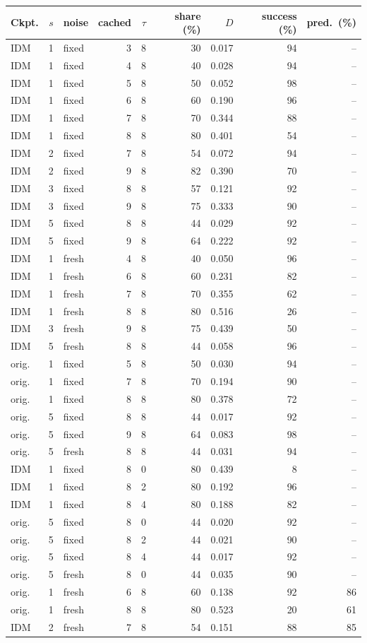 \begin{tabular}{@{}lrlrrrrrr@{}}
\toprule
Ckpt. & $s$ & noise & cached & $\tau$ & share (\%) & $D$ & success (\%) & pred.\ (\%) \\
\midrule
IDM & 1 & fixed & 3 & 8 & 30 & 0.017 & 94 & -- \\
IDM & 1 & fixed & 4 & 8 & 40 & 0.028 & 94 & -- \\
IDM & 1 & fixed & 5 & 8 & 50 & 0.052 & 98 & -- \\
IDM & 1 & fixed & 6 & 8 & 60 & 0.190 & 96 & -- \\
IDM & 1 & fixed & 7 & 8 & 70 & 0.344 & 88 & -- \\
IDM & 1 & fixed & 8 & 8 & 80 & 0.401 & 54 & -- \\
IDM & 2 & fixed & 7 & 8 & 54 & 0.072 & 94 & -- \\
IDM & 2 & fixed & 9 & 8 & 82 & 0.390 & 70 & -- \\
IDM & 3 & fixed & 8 & 8 & 57 & 0.121 & 92 & -- \\
IDM & 3 & fixed & 9 & 8 & 75 & 0.333 & 90 & -- \\
IDM & 5 & fixed & 8 & 8 & 44 & 0.029 & 92 & -- \\
IDM & 5 & fixed & 9 & 8 & 64 & 0.222 & 92 & -- \\
IDM & 1 & fresh & 4 & 8 & 40 & 0.050 & 96 & -- \\
IDM & 1 & fresh & 6 & 8 & 60 & 0.231 & 82 & -- \\
IDM & 1 & fresh & 7 & 8 & 70 & 0.355 & 62 & -- \\
IDM & 1 & fresh & 8 & 8 & 80 & 0.516 & 26 & -- \\
IDM & 3 & fresh & 9 & 8 & 75 & 0.439 & 50 & -- \\
IDM & 5 & fresh & 8 & 8 & 44 & 0.058 & 96 & -- \\
orig. & 1 & fixed & 5 & 8 & 50 & 0.030 & 94 & -- \\
orig. & 1 & fixed & 7 & 8 & 70 & 0.194 & 90 & -- \\
orig. & 1 & fixed & 8 & 8 & 80 & 0.378 & 72 & -- \\
orig. & 5 & fixed & 8 & 8 & 44 & 0.017 & 92 & -- \\
orig. & 5 & fixed & 9 & 8 & 64 & 0.083 & 98 & -- \\
orig. & 5 & fresh & 8 & 8 & 44 & 0.031 & 94 & -- \\
\midrule
IDM & 1 & fixed & 8 & 0 & 80 & 0.439 & 8 & -- \\
IDM & 1 & fixed & 8 & 2 & 80 & 0.192 & 96 & -- \\
IDM & 1 & fixed & 8 & 4 & 80 & 0.188 & 82 & -- \\
orig. & 5 & fixed & 8 & 0 & 44 & 0.020 & 92 & -- \\
orig. & 5 & fixed & 8 & 2 & 44 & 0.021 & 90 & -- \\
orig. & 5 & fixed & 8 & 4 & 44 & 0.017 & 92 & -- \\
orig. & 5 & fresh & 8 & 0 & 44 & 0.035 & 90 & -- \\
\midrule
orig. & 1 & fresh & 6 & 8 & 60 & 0.138 & 92 & 86 \\
orig. & 1 & fresh & 8 & 8 & 80 & 0.523 & 20 & 61 \\
IDM & 2 & fresh & 7 & 8 & 54 & 0.151 & 88 & 85 \\
\bottomrule
\end{tabular}
